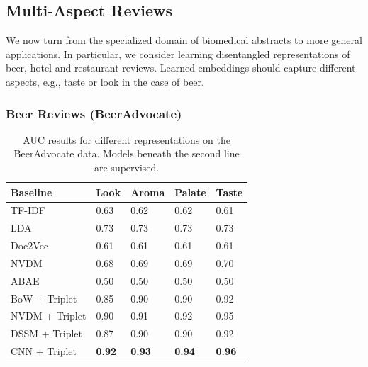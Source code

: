 \documentclass[11pt,a4paper]{article}
\begin{document}
\subsection{Multi-Aspect Reviews}

We now turn from the specialized domain of biomedical abstracts to more general applications. In particular, we consider learning disentangled representations of beer, hotel and restaurant reviews. Learned embeddings should capture different aspects, e.g., taste or look in the case of beer.

\subsubsection{Beer Reviews (BeerAdvocate)}
\begin{table}%
\setlength{\tabcolsep}{2pt}
\footnotesize
    \centering
    \begin{tabularx}{\columnwidth}{ l X X X X }
     Baseline & Look & Aroma & Palate & Taste  \\
    \hline
    TF-IDF & 0.63 & 0.62 & 0.62 & 0.61  \\
    LDA & 0.73 & 0.73 & 0.73 & 0.73 \\
    Doc2Vec & 0.61 & 0.61 & 0.61 & 0.61  \\
    NVDM & 0.68 & 0.69 & 0.69 & 0.70 \\
    ABAE & 0.50 & 0.50 & 0.50 & 0.50 \\
    \hline
    BoW + Triplet & 0.85 & 0.90 & 0.90 & 0.92 \\
    NVDM + Triplet & 0.90 & 0.91 & 0.92 & 0.95 \\
    DSSM + Triplet &  0.87 & 0.90 & 0.90 & 0.92 \\
    CNN + Triplet & \textbf{0.92} & \textbf{0.93} & \textbf{0.94} & \textbf{0.96} \\
    \end{tabularx}
    \caption{AUC results for different representations on the BeerAdvocate data. Models beneath the second line are supervised.}
    \label{table:beerauc}
\end{table}
\end{document}
